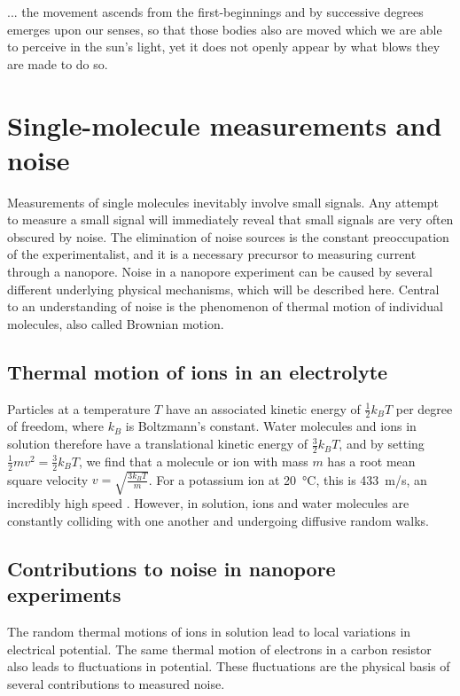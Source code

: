 \begin{savequote}[75mm]
... the movement ascends from the first-beginnings and by successive degrees emerges upon our senses, so that those bodies also are moved which we are able to perceive in the sun's light, yet it does not openly appear by what blows they are made to do so.
\end{savequote}

\chapter{Single-molecule measurements and noise}
\label{thermal_motion}

Measurements of single molecules inevitably involve small signals.  Any attempt to measure a small signal will immediately reveal that small signals are very often obscured by noise.  The elimination of noise sources is the constant preoccupation of the experimentalist, and it is a necessary precursor to measuring current through a nanopore.  Noise in a nanopore experiment can be caused by several different underlying physical mechanisms, which will be described here.  Central to an understanding of noise is the phenomenon of thermal motion of individual molecules, also called Brownian motion.

\section{Thermal motion of ions in an electrolyte}

Particles at a temperature $T$ have an associated kinetic energy of $\frac{1}{2} k_B T$ per degree of freedom, where $k_B$ is Boltzmann's constant.  Water molecules and ions in solution therefore have a translational kinetic energy of $\frac{3}{2} k_B T$, and by setting $\frac{1}{2} mv^2 = \frac{3}{2} k_B T$, we find that a molecule or ion with mass $m$ has a root mean square velocity $v=\sqrt{\frac{3 k_B T}{m}}$.  For a potassium ion at \SI{20}{\celsius}, this is \SI{433}{\m/\s}, an incredibly high speed \citep{Hille2001}.  However, in solution, ions and water molecules are constantly colliding with one another and undergoing diffusive random walks.

\section{Contributions to noise in nanopore experiments}

The random thermal motions of ions in solution lead to local variations in electrical potential.  The same thermal motion of electrons in a carbon resistor also leads to fluctuations in potential.  These fluctuations are the physical basis of several contributions to measured noise.

